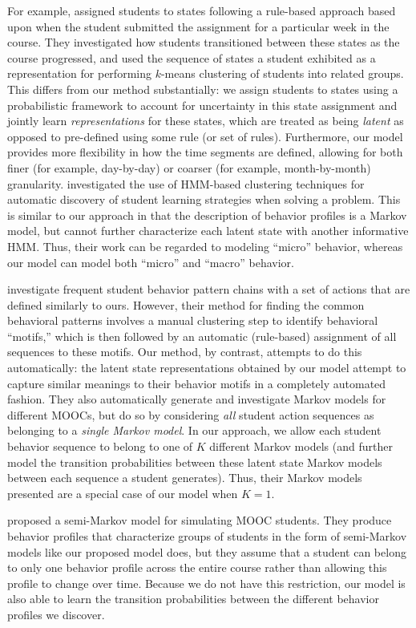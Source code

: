 For example, \citet{Kizilcec:2013:LAK} assigned students to states
following a rule-based approach based upon when the student submitted the
assignment for a particular week in the course. They investigated how
students transitioned between these states as the course progressed, and
used the sequence of states a student exhibited as a representation for
performing $k$-means clustering of students into related groups. This
differs from our method substantially: we assign students to states using a
probabilistic framework to account for uncertainty in this state
assignment and jointly learn \emph{representations} for these states,
which are treated as being \emph{latent} as opposed to pre-defined using
some rule (or set of rules).  Furthermore, our model provides more
flexibility in how the time segments are defined, allowing for both finer
(for example, day-by-day) or coarser (for example, month-by-month)
granularity. \citet{Shih:2010:EDM} investigated the use of HMM-based
clustering techniques for automatic discovery of student learning
strategies when solving a problem. This is similar to our approach in that
the description of behavior profiles is a Markov model, but cannot further
characterize each latent state with another informative HMM. Thus, their
work can be regarded to modeling ``micro'' behavior, whereas our model can
model both ``micro'' and ``macro'' behavior.

\citet{Davis:2016:EDM} investigate frequent student behavior pattern chains
with a set of actions that are defined similarly to ours. However, their
method for finding the common behavioral patterns involves a manual
clustering step to identify behavioral ``motifs,'' which is then followed
by an automatic (rule-based) assignment of all sequences to these motifs.
Our method, by contrast, attempts to do this automatically: the latent
state representations obtained by our model attempt to capture similar
meanings to their behavior motifs in a completely automated fashion. They
also automatically generate and investigate Markov models for different
MOOCs, but do so by considering \emph{all} student action sequences as
belonging to a \emph{single Markov model}. In our approach, we allow each
student behavior sequence to belong to one of $K$ different Markov models
(and further model the transition probabilities between these latent state
Markov models between each sequence a student generates). Thus, their
Markov models presented are a special case of our model when $K = 1$.

\citet{Faucon:2016:EDM} proposed a semi-Markov model for simulating MOOC
students. They produce behavior profiles that characterize groups of
students in the form of semi-Markov models like our proposed model does,
but they assume that a student can belong to only one behavior profile
across the entire course rather than allowing this profile to change over
time. Because we do not have this restriction, our model is also able to
learn the transition probabilities between the different behavior profiles
we discover.

